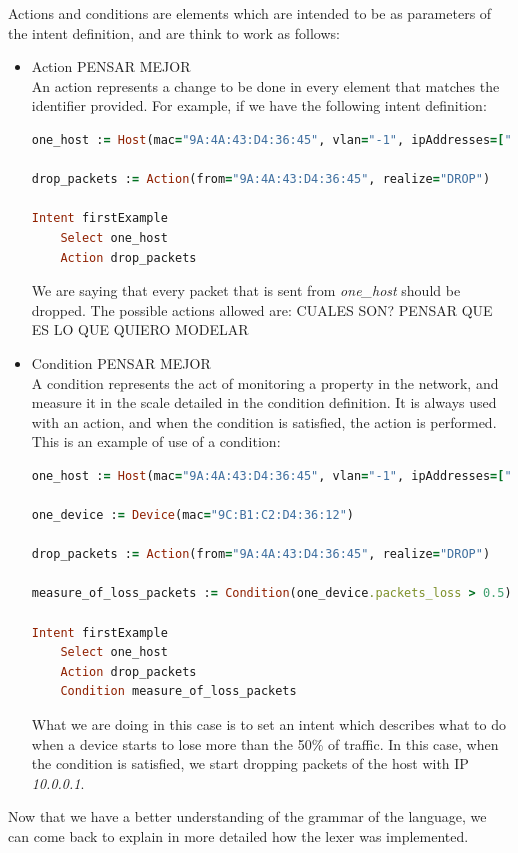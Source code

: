 Actions and conditions are elements which are intended to be as parameters of the intent definition, and are think to work as follows:
\begin{itemize}
\item Action PENSAR MEJOR\\
An action represents a change to be done in every element that matches the identifier provided. For example, if we have the following intent definition:
\begin{lstlisting}[language=Ruby,breaklines=true]
one_host := Host(mac="9A:4A:43:D4:36:45", vlan="-1", ipAddresses=["10.0.0.1"], elementId="of:0000000000000002", port="1")

drop_packets := Action(from="9A:4A:43:D4:36:45", realize="DROP")

Intent firstExample
    Select one_host
    Action drop_packets
\end{lstlisting}

We are saying that every packet that is sent from \textit{one\_host} should be dropped. The possible actions allowed are: CUALES SON? PENSAR QUE ES LO QUE QUIERO MODELAR
\item Condition PENSAR MEJOR\\
A condition represents the act of monitoring a property in the network, and measure it in the scale detailed in the condition definition. It is always used with an action, and when the condition is satisfied, the action is performed. This is an example of use of a condition:
\begin{lstlisting}[language=Ruby,breaklines=true]
one_host := Host(mac="9A:4A:43:D4:36:45", vlan="-1", ipAddresses=["10.0.0.1"], elementId="of:0000000000000002", port="1")

one_device := Device(mac="9C:B1:C2:D4:36:12")

drop_packets := Action(from="9A:4A:43:D4:36:45", realize="DROP")

measure_of_loss_packets := Condition(one_device.packets_loss > 0.5)

Intent firstExample
    Select one_host
    Action drop_packets
    Condition measure_of_loss_packets
\end{lstlisting}
What we are doing in this case is to set an intent which describes what to do when a device starts to lose more than the 50\% of traffic. In this case, when the condition is satisfied, we start dropping packets of the host with IP \textit{10.0.0.1}.
\end{itemize}

Now that we have a better understanding of the grammar of the language, we can come back to explain in more detailed how the lexer was implemented.

